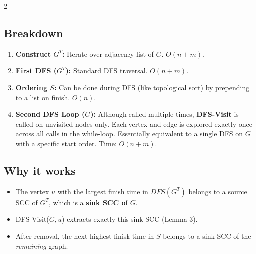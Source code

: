 \documentclass[a4paper,10pt]{article}
\begin{document}
\begin{multicols}{2}
\subsection{Breakdown}
\begin{enumerate}
    \item \textbf{Construct $G^T$:} Iterate over adjacency list of $G$. $O(n+m)$.
    \item \textbf{First DFS ($G^T$):} Standard DFS traversal. $O(n+m)$.
    \item \textbf{Ordering $S$:} Can be done during DFS (like topological sort) by prepending to a list on finish. $O(n)$.
    \item \textbf{Second DFS Loop ($G$):}
    Although called multiple times, \textbf{DFS-Visit} is called on unvisited nodes only.
    Each vertex and edge is explored exactly once across all calls in the while-loop.
    Essentially equivalent to a single DFS on $G$ with a specific start order.
    Time: $O(n+m)$.
\end{enumerate}

\subsection{Why it works}
\begin{itemize}
    \item The vertex $u$ with the largest finish time in $DFS(G^T)$ belongs to a source SCC of $G^T$, which is a \textbf{sink SCC of $G$}.
    \item DFS-Visit($G, u$) extracts exactly this sink SCC (Lemma 3).
    \item After removal, the next highest finish time in $S$ belongs to a sink SCC of the \textit{remaining} graph.
\end{itemize}

\end{multicols}
\end{document}
